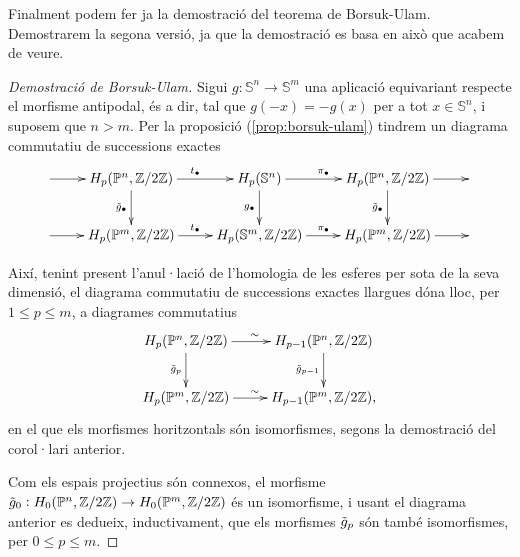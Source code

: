 \documentclass[../main.tex]{subfiles}
\begin{document}
Finalment podem fer ja la demostració del teorema de Borsuk-Ulam. Demostrarem la segona versió, ja que la demostració es basa en això que acabem de veure.

\begin{proof}
[Demostració de Borsuk-Ulam] Sigui $g:\mathbb{S}^n\rightarrow \mathbb{S}^m$ una aplicació equivariant respecte el morfisme antipodal, és a dir, tal que $g(-x) = -g(x)$ per a tot $x\in\mathbb{S}^n$, i suposem que $n>m$. Per la proposició (\ref{prop:borsuk-ulam}) tindrem un diagrama commutatiu de successions exactes
\begin{equation}
        \notag
        \xymatrix{
        \ar[r]&H_p(\mathbb{P}^n,\mathbb{Z}/2\mathbb{Z})\ar[r]^{t_\bullet}\ar[d]_{\Tilde{g}_\bullet} & H_p(\mathbb{S}^n)\ar[r]^{\pi_\bullet}\ar[d]_{g_\bullet} & H_p(\mathbb{P}^n,\mathbb{Z}/2\mathbb{Z})\ar[r]\ar[d]_{\Tilde{g}_\bullet} & \\
        \ar[r] & H_p(\mathbb{P}^m,\mathbb{Z}/2\mathbb{Z})\ar[r]^{t_\bullet}& H_p(\mathbb{S}^m,\mathbb{Z}/2\mathbb{Z})\ar[r]^{\pi_\bullet} & H_p(\mathbb{P}^m,\mathbb{Z}/2\mathbb{Z})\ar[r] & 
        }
\end{equation}

Així, tenint present l'anul·lació de l'homologia de les esferes per sota de la seva dimensió, el diagrama commutatiu de successions exactes llargues dóna lloc, per $1\leq p\leq m$, a diagrames commutatius
\begin{equation}
    \notag
    \xymatrix{
    H_p(\mathbb{P}^n,\mathbb{Z}/2\mathbb{Z})\ar[r]^\sim\ar[d]_{\Tilde{g}_p} & H_{p-1}(\mathbb{P}^n,\mathbb{Z}/2\mathbb{Z})\ar[d]_{\Tilde{g}_{p-1}}\\
    H_p(\mathbb{P}^m,\mathbb{Z}/2\mathbb{Z})\ar[r]^\sim & H_{p-1}(\mathbb{P}^m,\mathbb{Z}/2\mathbb{Z}),
    }
\end{equation}
en el que els morfismes horitzontals són isomorfismes, segons la demostració del corol·lari anterior.

Com els espais projectius són connexos, el morfisme $\Tilde{g}_0:H_0(\mathbb{P}^n,\mathbb{Z}/2\mathbb{Z})\rightarrow H_0(\mathbb{P}^m,\mathbb{Z}/2\mathbb{Z})$ és un isomorfisme, i usant el diagrama anterior es dedueix, inductivament, que els morfismes $\Tilde{g}_p$ són també isomorfismes, per $0\leq p\leq m$.


\end{proof}
\end{document}
